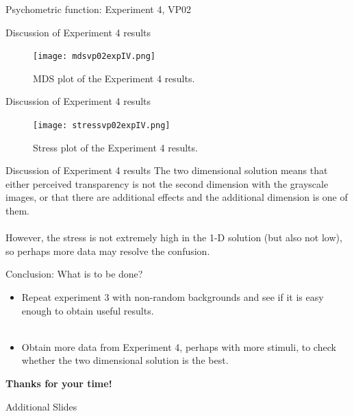 \documentclass{beamer}
\begin{document}
\begin{frame}[t]{Psychometric function: Experiment 4, VP02}
\end{frame}

\begin{frame}[t]{Discussion of Experiment 4 results}
\begin{figure}[c]
\texttt{[image: mdsvp02expIV.png]}
\caption{MDS plot of the Experiment 4 results.}
\end{figure}
\end{frame}

\begin{frame}[t]{Discussion of Experiment 4 results}
\begin{figure}[c]
\texttt{[image: stressvp02expIV.png]}
\caption{Stress plot of the Experiment 4 results.}
\end{figure}
\end{frame}

\begin{frame}[t]{Discussion of Experiment 4 results}
The two dimensional solution means that either perceived transparency is not the second dimension with the grayscale images, or that there are additional effects and the additional dimension is one of them.\\
~\\
However, the stress is not extremely high in the 1-D solution (but also not low), so perhaps more data may resolve the confusion.
\end{frame}

\begin{frame}[t]{Conclusion: What is to be done?}
\begin{itemize}
\item Repeat experiment 3 with non-random backgrounds and see if it is easy enough to obtain useful results.\\
~\\
\item Obtain more data from Experiment 4, perhaps with more stimuli, to check whether the two dimensional solution is the best.
\\
\end{itemize}

{\bf Thanks for your time!}
\end{frame}
\begin{frame}[t]{Additional Slides}
\end{frame}
\end{document}
